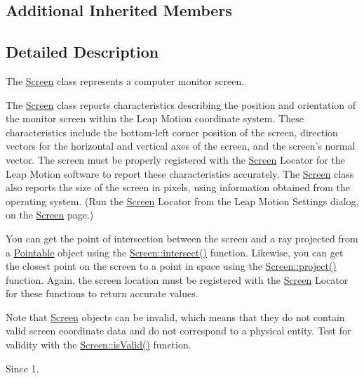 \subsection*{Additional Inherited Members}


\subsection{Detailed Description}
The \hyperlink{class_leap_1_1_screen}{Screen} class represents a computer monitor screen.

The \hyperlink{class_leap_1_1_screen}{Screen} class reports characteristics describing the position and orientation of the monitor screen within the Leap Motion coordinate system. These characteristics include the bottom-\/left corner position of the screen, direction vectors for the horizontal and vertical axes of the screen, and the screen's normal vector. The screen must be properly registered with the \hyperlink{class_leap_1_1_screen}{Screen} Locator for the Leap Motion software to report these characteristics accurately. The \hyperlink{class_leap_1_1_screen}{Screen} class also reports the size of the screen in pixels, using information obtained from the operating system. (Run the \hyperlink{class_leap_1_1_screen}{Screen} Locator from the Leap Motion Settings dialog, on the \hyperlink{class_leap_1_1_screen}{Screen} page.)

You can get the point of intersection between the screen and a ray projected from a \hyperlink{class_leap_1_1_pointable}{Pointable} object using the \hyperlink{class_leap_1_1_screen_a4264a354488a387ab5657c73d594b41a}{Screen\+::intersect()} function. Likewise, you can get the closest point on the screen to a point in space using the \hyperlink{class_leap_1_1_screen_a5ac637faf6b1c296ce3289265ecb359d}{Screen\+::project()} function. Again, the screen location must be registered with the \hyperlink{class_leap_1_1_screen}{Screen} Locator for these functions to return accurate values.

Note that \hyperlink{class_leap_1_1_screen}{Screen} objects can be invalid, which means that they do not contain valid screen coordinate data and do not correspond to a physical entity. Test for validity with the \hyperlink{class_leap_1_1_screen_aebb6c054d2b35e27b8991618945ec614}{Screen\+::is\+Valid()} function. \begin{DoxySince}{Since}
1. 
\end{DoxySince}


